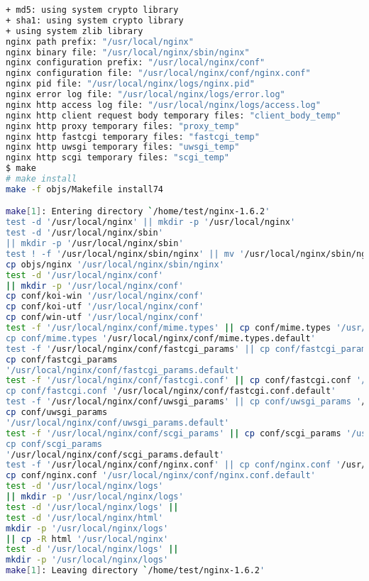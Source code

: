 \begin{lstlisting}[language=bash]
+ md5: using system crypto library
+ sha1: using system crypto library
+ using system zlib library
nginx path prefix: "/usr/local/nginx"
nginx binary file: "/usr/local/nginx/sbin/nginx"
nginx configuration prefix: "/usr/local/nginx/conf"
nginx configuration file: "/usr/local/nginx/conf/nginx.conf"
nginx pid file: "/usr/local/nginx/logs/nginx.pid"
nginx error log file: "/usr/local/nginx/logs/error.log"
nginx http access log file: "/usr/local/nginx/logs/access.log"
nginx http client request body temporary files: "client_body_temp"
nginx http proxy temporary files: "proxy_temp"
nginx http fastcgi temporary files: "fastcgi_temp"
nginx http uwsgi temporary files: "uwsgi_temp"
nginx http scgi temporary files: "scgi_temp"
$ make
# make install
make -f objs/Makefile install74

make[1]: Entering directory `/home/test/nginx-1.6.2'
test -d '/usr/local/nginx' || mkdir -p '/usr/local/nginx'
test -d '/usr/local/nginx/sbin'
|| mkdir -p '/usr/local/nginx/sbin'
test ! -f '/usr/local/nginx/sbin/nginx' || mv '/usr/local/nginx/sbin/nginx' '/usr/local
cp objs/nginx '/usr/local/nginx/sbin/nginx'
test -d '/usr/local/nginx/conf'
|| mkdir -p '/usr/local/nginx/conf'
cp conf/koi-win '/usr/local/nginx/conf'
cp conf/koi-utf '/usr/local/nginx/conf'
cp conf/win-utf '/usr/local/nginx/conf'
test -f '/usr/local/nginx/conf/mime.types' || cp conf/mime.types '/usr/local/nginx/conf
cp conf/mime.types '/usr/local/nginx/conf/mime.types.default'
test -f '/usr/local/nginx/conf/fastcgi_params' || cp conf/fastcgi_params '/usr/local/ng
cp conf/fastcgi_params
'/usr/local/nginx/conf/fastcgi_params.default'
test -f '/usr/local/nginx/conf/fastcgi.conf' || cp conf/fastcgi.conf '/usr/local/nginx/
cp conf/fastcgi.conf '/usr/local/nginx/conf/fastcgi.conf.default'
test -f '/usr/local/nginx/conf/uwsgi_params' || cp conf/uwsgi_params '/usr/local/nginx/
cp conf/uwsgi_params
'/usr/local/nginx/conf/uwsgi_params.default'
test -f '/usr/local/nginx/conf/scgi_params' || cp conf/scgi_params '/usr/local/nginx/co
cp conf/scgi_params
'/usr/local/nginx/conf/scgi_params.default'
test -f '/usr/local/nginx/conf/nginx.conf' || cp conf/nginx.conf '/usr/local/nginx/conf
cp conf/nginx.conf '/usr/local/nginx/conf/nginx.conf.default'
test -d '/usr/local/nginx/logs'
|| mkdir -p '/usr/local/nginx/logs'
test -d '/usr/local/nginx/logs' ||
test -d '/usr/local/nginx/html'
mkdir -p '/usr/local/nginx/logs'
|| cp -R html '/usr/local/nginx'
test -d '/usr/local/nginx/logs' ||
mkdir -p '/usr/local/nginx/logs'
make[1]: Leaving directory `/home/test/nginx-1.6.2'
\end{lstlisting}


